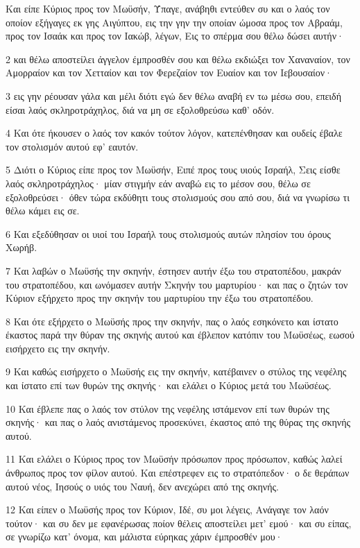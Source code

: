 \par Και είπε Κύριος προς τον Μωϋσήν, Ύπαγε, ανάβηθι εντεύθεν συ και ο λαός τον οποίον εξήγαγες εκ γης Αιγύπτου, εις την γην την οποίαν ώμοσα προς τον Αβραάμ, προς τον Ισαάκ και προς τον Ιακώβ, λέγων, Εις το σπέρμα σου θέλω δώσει αυτήν·
\par 2 και θέλω αποστείλει άγγελον έμπροσθέν σου και θέλω εκδιώξει τον Χαναναίον, τον Αμορραίον και τον Χετταίον και τον Φερεζαίον τον Ευαίον και τον Ιεβουσαίον·
\par 3 εις γην ρέουσαν γάλα και μέλι διότι εγώ δεν θέλω αναβή εν τω μέσω σου, επειδή είσαι λαός σκληροτράχηλος, διά να μη σε εξολοθρεύσω καθ' οδόν.
\par 4 Και ότε ήκουσεν ο λαός τον κακόν τούτον λόγον, κατεπένθησαν και ουδείς έβαλε τον στολισμόν αυτού εφ' εαυτόν.
\par 5 Διότι ο Κύριος είπε προς τον Μωϋσήν, Ειπέ προς τους υιούς Ισραήλ, Σεις είσθε λαός σκληροτράχηλος· μίαν στιγμήν εάν αναβώ εις το μέσον σου, θέλω σε εξολοθρεύσει· όθεν τώρα εκδύθητι τους στολισμούς σου από σου, διά να γνωρίσω τι θέλω κάμει εις σε.
\par 6 Και εξεδύθησαν οι υιοί του Ισραήλ τους στολισμούς αυτών πλησίον του όρους Χωρήβ.
\par 7 Και λαβών ο Μωϋσής την σκηνήν, έστησεν αυτήν έξω του στρατοπέδου, μακράν του στρατοπέδου, και ωνόμασεν αυτήν Σκηνήν του μαρτυρίου· και πας ο ζητών τον Κύριον εξήρχετο προς την σκηνήν του μαρτυρίου την έξω του στρατοπέδου.
\par 8 Και ότε εξήρχετο ο Μωϋσής προς την σκηνήν, πας ο λαός εσηκόνετο και ίστατο έκαστος παρά την θύραν της σκηνής αυτού και έβλεπον κατόπιν του Μωϋσέως, εωσού εισήρχετο εις την σκηνήν.
\par 9 Και καθώς εισήρχετο ο Μωϋσής εις την σκηνήν, κατέβαινεν ο στύλος της νεφέλης και ίστατο επί των θυρών της σκηνής· και ελάλει ο Κύριος μετά του Μωϋσέως.
\par 10 Και έβλεπε πας ο λαός τον στύλον της νεφέλης ιστάμενον επί των θυρών της σκηνής· και πας ο λαός ανιστάμενος προσεκύνει, έκαστος από της θύρας της σκηνής αυτού.
\par 11 Και ελάλει ο Κύριος προς τον Μωϋσήν πρόσωπον προς πρόσωπον, καθώς λαλεί άνθρωπος προς τον φίλον αυτού. Και επέστρεφεν εις το στρατόπεδον· ο δε θεράπων αυτού νέος, Ιησούς ο υιός του Ναυή, δεν ανεχώρει από της σκηνής.
\par 12 Και είπεν ο Μωϋσής προς τον Κύριον, Ιδέ, συ μοι λέγεις, Ανάγαγε τον λαόν τούτον· και συ δεν με εφανέρωσας ποίον θέλεις αποστείλει μετ' εμού· και συ είπας, σε γνωρίζω κατ' όνομα, και μάλιστα εύρηκας χάριν έμπροσθέν μου·
